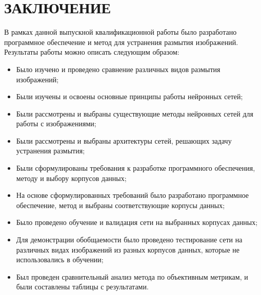 \part*{ЗАКЛЮЧЕНИЕ}

В рамках данной выпускной квалификационной работы было разработано программное обеспечение и метод для устранения размытия изображений. Результаты работы можно описать следующим образом:

\begin{itemize}[left=0.49cm]
    \item Было изучено и проведено сравнение различных видов размытия изображений;
    \item Были изучены и освоены основные принципы работы нейронных сетей;
    \item Были рассмотрены и выбраны существующие методы нейронных сетей для работы с изображениями;
    \item Были рассмотрены и выбраны архитектуры сетей, решающих задачу устранения размытия;
    \item Были сформулированы требования к разработке программного обеспечения, методу и выбору корпусов данных;
    \item На основе сформулированных требований было разработано программное обеспечение, метод и выбраны соответствующие корпусы данных;
    \item Было проведено обучение и валидация сети на выбранных корпусах данных;
    \item Для демонстрации обобщаемости было проведено тестирование сети на различных видах изображений из разных корпусов данных, которые не использовались в обучении;
    \item Был проведен сравнительный анализ метода по объективным метрикам, и были составлены таблицы с результатами.
\end{itemize}


